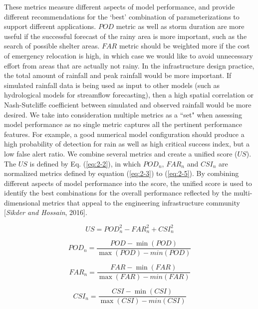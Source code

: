 These metrics measure different aspects of model performance, and provide different recommendations for the ‘best’ combination of parameterizations to support different applications. $POD$ metric as well as storm duration are more useful if the successful forecast of the rainy area is more important, such as the search of possible shelter areas. $FAR$ metric should be weighted more if the cost of emergency relocation is high, in which case we would like to avoid unnecessary effort from areas that are actually not rainy. In the infrastructure design practice, the total amount of rainfall and peak rainfall would be more important. If simulated rainfall data is being used as input to other models (such as hydrological models for streamflow forecasting), then a high spatial correlation or Nash-Sutcliffe coefficient between simulated and observed rainfall would be more desired.
We take into consideration multiple metrics as a ``set" when assessing model performance as no single metric captures all the pertinent performance features. For example, a good numerical model configuration should produce a high probability of detection for rain as well as high critical success index, but a low false alert ratio. We combine several metrics and create a unified score ($US$). The $US$ is defined by Eq. (\ref{eq:2-2}), in which $POD_n$, $FAR_n$ and $CSI_n$ are normalized metrics defined by equation (\ref{eq:2-3}) to (\ref{eq:2-5}). By combining different aspects of model performance into the score, the unified score is used to identify the best combinations for the overall performance reflected by the multi-dimensional metrics that appeal to the engineering infrastructure community [\textit{Sikder and Hossain}, 2016].

\begin{equation}
	US = POD_n^2 - FAR_n^2 + CSI_n^2
	\label{eq:2-2}
\end{equation}

\begin{equation}
	PO{D_n} = \frac{{POD - \min (POD)}}{{\max (POD) - min(POD)}}
	\label{eq:2-3}
\end{equation}

\begin{equation}
	FA{R_n} = \frac{{FAR - \min (FAR)}}{{\max (FAR) - min(FAR)}}
	\label{eq:2-4}
\end{equation}

\begin{equation}
	CS{I_n} = \frac{{CSI - \min (CSI)}}{{\max (CSI) - min(CSI)}}
	\label{eq:2-5}
\end{equation}

